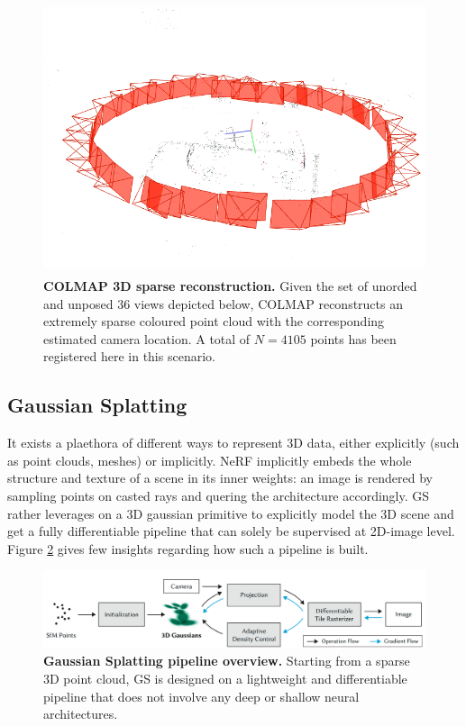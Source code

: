 \begin{figure}[htb!]
    \center
  \includegraphics[height=8cm]{images/gaussiansplatting/colmap_sparsePC.png}
  \caption{\textbf{COLMAP 3D sparse reconstruction.} Given the set of unorded and unposed 36 views depicted below, COLMAP reconstructs an extremely sparse coloured point cloud with the corresponding estimated camera location. A total of $N=4105$ points has been registered here in this scenario.}
  \label{fig:gs-sfm}
\end{figure}


\subsection{Gaussian Splatting}
\label{subsec:gs-gs}

It exists a plaethora of different ways to represent 3D data, either explicitly (such as point clouds, meshes) or implicitly. \ac{NeRF} implicitly embeds the whole structure and texture of a scene in its inner weights: an image is rendered by sampling points on casted rays and quering the architecture accordingly. \ac{GS} rather leverages on a 3D gaussian primitive to explicitly model the 3D scene and get a fully differentiable pipeline that can solely be supervised at 2D-image level. Figure \ref{fig:gs-overview} gives few insights regarding how such a pipeline is built.  


\begin{figure}[htb!]
    \center
  \includegraphics[width=\linewidth]{images/gaussiansplatting/overview-pipelineGS.png}
  \caption{\textbf{Gaussian Splatting pipeline overview.} Starting from a sparse 3D point cloud, \ac{GS} is designed on a lightweight and differentiable pipeline that does not involve any deep or shallow neural architectures.}
  \label{fig:gs-overview}
\end{figure}


